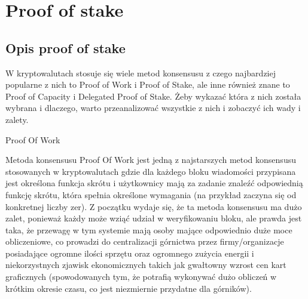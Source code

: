 \section{Proof of stake}
\subsection{Opis proof of stake}
W kryptowalutach stosuje się wiele metod konsensusu z czego najbardziej popularne z nich to Proof of Work i Proof of Stake, ale inne również znane to Proof of Capacity i Delegated Proof of Stake. Żeby wykazać która z nich została wybrana i dlaczego, warto przeanalizować wszystkie z nich i zobaczyć ich wady i zalety.

\vspace{1em}

Proof Of Work

\vspace{1em}

Metoda konsensusu Proof Of Work jest jedną z najstarszych metod konsensusu stosowanych w kryptowalutach gdzie dla każdego bloku wiadomości przypisana jest określona funkcja skrótu i użytkownicy mają za zadanie znaleźć odpowiednią funkcję skrótu, która spełnia określone wymagania (na przykład zaczyna się od konkretnej liczby zer). Z początku wydaje się, że ta metoda konsensusu ma dużo zalet, ponieważ każdy może wziąć udział w weryfikowaniu bloku, ale prawda jest taka, że przewagę w tym systemie mają osoby mające odpowiednio duże moce obliczeniowe, co prowadzi do centralizacji górnictwa przez firmy/organizacje posiadające ogromne ilości sprzętu oraz ogromnego zużycia energii i niekorzystnych zjawisk ekonomicznych takich jak gwałtowny wzrost cen kart graficznych (spowodowanych tym, że potrafią wykonywać dużo obliczeń w krótkim okresie czasu, co jest niezmiernie przydatne dla górników).

\vspace{1em}

